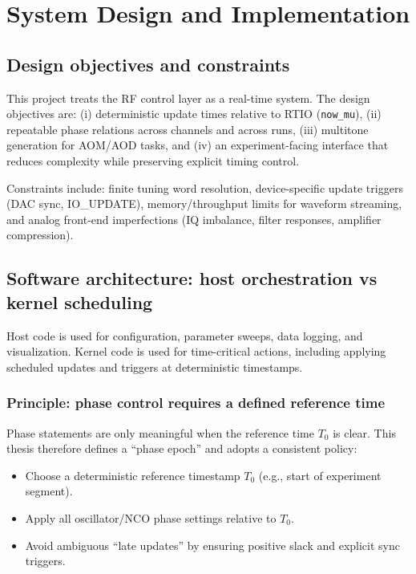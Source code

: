 \chapter{System Design and Implementation}
\label{ch:system_design}

\section{Design objectives and constraints}
This project treats the RF control layer as a real-time system. The design objectives are:
(i) deterministic update times relative to RTIO (\texttt{now\_mu}),
(ii) repeatable phase relations across channels and across runs,
(iii) multitone generation for AOM/AOD tasks,
and (iv) an experiment-facing interface that reduces complexity while preserving explicit timing control.

Constraints include: finite tuning word resolution, device-specific update triggers (DAC sync, IO\_UPDATE),
memory/throughput limits for waveform streaming, and analog front-end imperfections (IQ imbalance, filter
responses, amplifier compression).

\section{Software architecture: host orchestration vs kernel scheduling}
Host code is used for configuration, parameter sweeps, data logging, and visualization. Kernel code is used for
time-critical actions, including applying scheduled updates and triggers at deterministic timestamps.

\subsection{Principle: phase control requires a defined reference time}
Phase statements are only meaningful when the reference time $T_0$ is clear. This thesis therefore defines
a “phase epoch” and adopts a consistent policy:
\begin{itemize}[leftmargin=*]
  \item Choose a deterministic reference timestamp $T_0$ (e.g., start of experiment segment).
  \item Apply all oscillator/NCO phase settings relative to $T_0$.
  \item Avoid ambiguous “late updates” by ensuring positive slack and explicit sync triggers.
\end{itemize}

